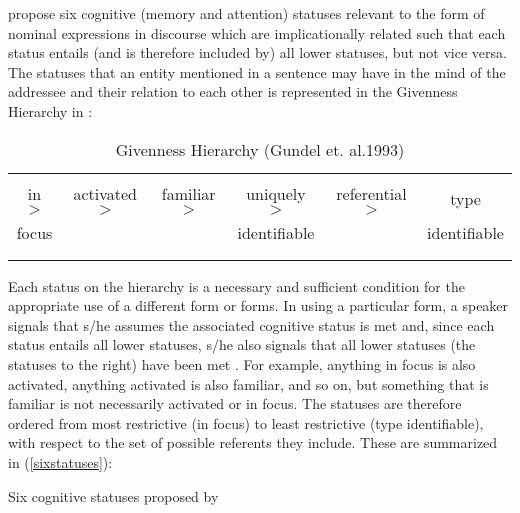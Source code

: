 \citet{gundel1993} propose six cognitive (memory and attention) statuses relevant to the form of nominal expressions in discourse which are implicationally related such that each status entails (and is therefore included by) all lower statuses, but not vice versa. The statuses that an entity mentioned in a sentence may have in the mind of the addressee and their relation to each other is represented in the Givenness Hierarchy in :

\begin{table} 

\begin{tabular}{ c c c c c c }

\midrule
& & & & & \\
in $>$ & activated $>$ & familiar  $>$ & uniquely  $>$ & referential $>$ & type \\
focus &  &  &   identifiable  &  & identifiable \\
& & & & &  \\

\lspbottomrule
\end{tabular}\caption{{Givenness Hierarchy (Gundel et. al.1993)}}
\label{givennesshierarchy} 

\end{table}
Each status on the hierarchy is a necessary and sufficient condition for the appropriate use of a different form or forms. In using a particular form, a speaker signals that s/he assumes the associated cognitive status is met and, since each status entails all lower statuses, s/he also signals that all lower statuses (the statuses to the right) have been met \citep[275]{gundel1993}. For example, anything in focus is also activated, anything activated is also familiar, and so on, but something that is familiar is not necessarily activated or in focus. The statuses are therefore ordered from most restrictive (in focus) to least restrictive (type identifiable), with respect to the set of possible referents they include. These are summarized in (\ref{sixstatuses}):

\ea\label{sixstatuses} Six cognitive statuses proposed by \citet{gundel1993}

